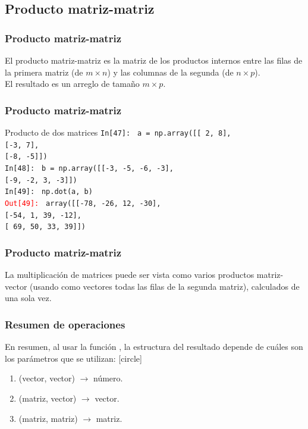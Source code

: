 \subsection{Producto matriz-matriz}
\begin{frame}[fragile]
\frametitle{Producto matriz-matriz}
El producto matriz-matriz es la matriz de los productos internos entre las filas de la primera matriz (de $m \times n$) y las columnas de la segunda (de $n \times p$).
\\
\bigskip
El resultado es un arreglo de tamaño $m \times p$.
\end{frame}
\begin{frame}[fragile]
\frametitle{Producto matriz-matriz}
\fontsize{12}{12}\selectfont   
\begin{exampleblock}{Producto de dos matrices}
\textcolor{ao}{\texttt{In[47]: }} \texttt{a = np.array([[ 2,  8],} \\
\hspace{4cm} \texttt{[-3,  7],} \\
\hspace{4cm} \texttt{[-8, -5]])} \\
\medskip
\pause
\textcolor{ao}{\texttt{In[48]: }} \texttt{b = np.array([[-3, -5, -6, -3],} \\
\hspace{4cm} \texttt{[-9, -2,  3, -3]])} \\
\medskip
\pause
\textcolor{ao}{\texttt{In[49]: }} \texttt{np.dot(a, b)} \\
\medskip
\pause
\textcolor{red}{\texttt{Out[49]: }} \texttt{array([[-78, -26,  12, -30],} \\
\hspace{4cm} \texttt{[-54,   1,  39, -12],} \\
\hspace{4cm} \texttt{[ 69,  50,  33,  39]])}
\end{exampleblock}
\end{frame}
\begin{frame}
\frametitle{Producto matriz-matriz}
La multiplicación de matrices puede ser vista como varios productos matriz-vector (usando como vectores todas las filas de la segunda matriz), calculados de una sola vez.
\end{frame}
\begin{frame}
\frametitle{Resumen de operaciones}
En resumen, al usar la función , la estructura del resultado depende de cuáles son los parámetros que se utilizan:
[circle]
\begin{enumerate}[<+->]
\item {}(vector, vector) $\rightarrow$ número.
\item {}(matriz, vector) $\rightarrow$ vector.
\item {}(matriz, matriz) $\rightarrow$ matriz.
\end{enumerate}
\end{frame}
